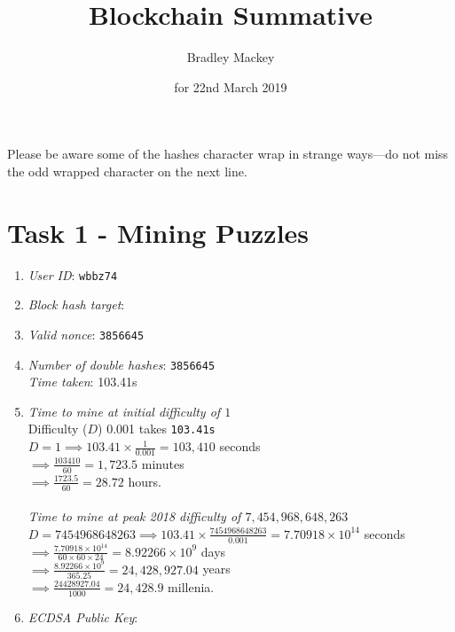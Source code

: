 \documentclass[11pt]{article}
\begin{document}
\title{\textbf{Blockchain Summative}}
\date{for 22nd March 2019}
\author{Bradley Mackey}
\maketitle

Please be aware some of the hashes character wrap in strange ways---do not miss the odd wrapped character on the next line.


\section*{Task 1 - Mining Puzzles}

\begin{enumerate}
\item \textit{User ID}: \texttt{wbbz74}
\item \textit{Block hash target}: \texttt{}
\item \textit{Valid nonce}: \texttt{3856645}
\item \textit{Number of double hashes}: \texttt{3856645}\\\textit{Time taken}: 103.41s
\item 
\textit{Time to mine at initial difficulty of $1$}\\
Difficulty ($D$) 0.001 takes \texttt{103.41s}\\
$D=1 \implies 103.41\times{\frac{1}{0.001}}=103,410$ seconds\\
$\implies \frac{103410}{60}=1,723.5$ minutes\\
$\implies \frac{1723.5}{60}=28.72$ hours.\\
\\
\textit{Time to mine at peak 2018 difficulty of $7,454,968,648,263$}\\
$D=7454968648263 \implies 103.41\times{\frac{7454968648263}{0.001}}=7.70918\times10^{14}$ seconds\\
$\implies \frac{7.70918\times10^{14}}{60\times60\times24}=8.92266\times10^{9}$ days\\
$\implies \frac{8.92266\times10^{9}}{365.25}=24,428,927.04$ years\\
$\implies \frac{24428927.04}{1000}=24,428.9$ millenia.\\

\item \textit{ECDSA Public Key}: \texttt{}


\end{enumerate}
\end{document}

